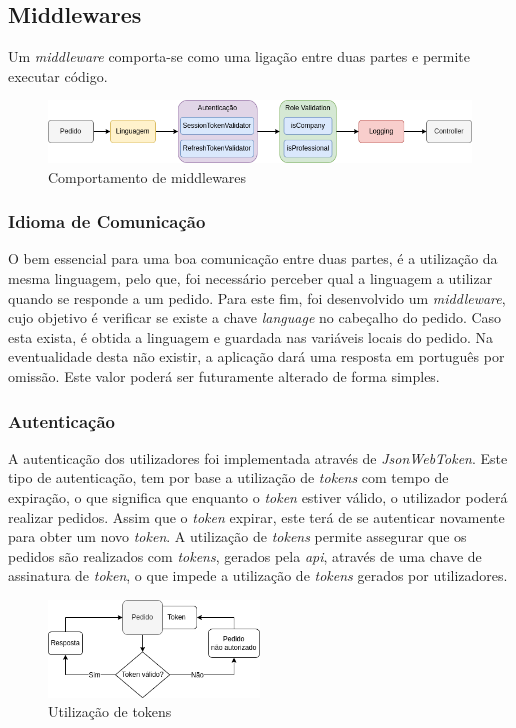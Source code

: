 \subsection{Middlewares} 
Um \textit{middleware} comporta-se como uma ligação entre duas partes e permite executar código.

\begin{figure}[htb]
 \centering
 \includegraphics[width=\textwidth]{images/implementacao/api/middlewares.png}
 \caption{Comportamento de middlewares}
 \label{middlewares_png}
\end{figure}

\subsubsection{Idioma de Comunicação}
O bem essencial para uma boa comunicação entre duas partes, é a utilização da mesma linguagem, pelo que, foi necessário perceber qual a linguagem a utilizar quando se responde a um pedido. Para este fim, foi desenvolvido um \textit{middleware}, cujo objetivo é verificar se existe a chave \textit{language} no cabeçalho do pedido. Caso esta exista, é obtida a linguagem e guardada nas variáveis locais do pedido. Na eventualidade desta não existir, a aplicação dará uma resposta em português por omissão. Este valor poderá ser futuramente alterado de forma simples.

\newpage

\subsubsection{Autenticação}
A autenticação dos utilizadores foi implementada através de \textit{JsonWebToken}. Este tipo de autenticação, tem por base a utilização de \textit{tokens} com tempo de expiração, o que significa que enquanto o \textit{token} estiver válido, o utilizador poderá realizar pedidos. Assim que o \textit{token} expirar, este terá de se autenticar novamente para obter um novo \textit{token}.
A utilização de \textit{tokens} permite assegurar que os pedidos são realizados com \textit{tokens}, gerados pela \textit{\acrshort{api}}, através de uma chave de assinatura de \textit{token}, o que impede a utilização de \textit{tokens} gerados por utilizadores.
\begin{figure}[htb]
 \centering
 \includegraphics[width=0.5\textwidth]{images/implementacao/api/jwt_session.png}
 \caption{Utilização de tokens}
 \label{fig:64}
\end{figure}

